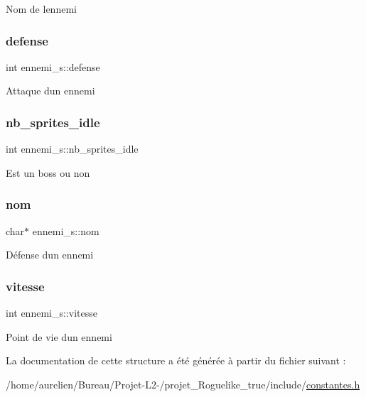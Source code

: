 Nom de l\textquotesingle{}ennemi \mbox{\label{structennemi__s_a8e04831164889e636a03551f33167ac9}} 
\subsubsection{\texorpdfstring{defense}{defense}}
{\footnotesize\ttfamily int ennemi\+\_\+s\+::defense}

Attaque d\textquotesingle{}un ennemi \mbox{\label{structennemi__s_acab1561fdaa24a1e81787be81e0adbb8}} 
\subsubsection{\texorpdfstring{nb\+\_\+sprites\+\_\+idle}{nb\_sprites\_idle}}
{\footnotesize\ttfamily int ennemi\+\_\+s\+::nb\+\_\+sprites\+\_\+idle}

Est un boss ou non \mbox{\label{structennemi__s_a0928cbeee6295b778f04976ef3bd7e03}} 
\subsubsection{\texorpdfstring{nom}{nom}}
{\footnotesize\ttfamily char$\ast$ ennemi\+\_\+s\+::nom}

Défense d\textquotesingle{}un ennemi \mbox{\label{structennemi__s_a2209ba506bbe6b6bfba8434837deba28}} 
\subsubsection{\texorpdfstring{vitesse}{vitesse}}
{\footnotesize\ttfamily int ennemi\+\_\+s\+::vitesse}

Point de vie d\textquotesingle{}un ennemi 

La documentation de cette structure a été générée à partir du fichier suivant \+:\begin{DoxyCompactItemize}
\item 
/home/aurelien/\+Bureau/\+Projet-\/\+L2-\//projet\+\_\+\+Roguelike\+\_\+true/include/\hyperlink{constantes_8h}{constantes.\+h}\end{DoxyCompactItemize}
